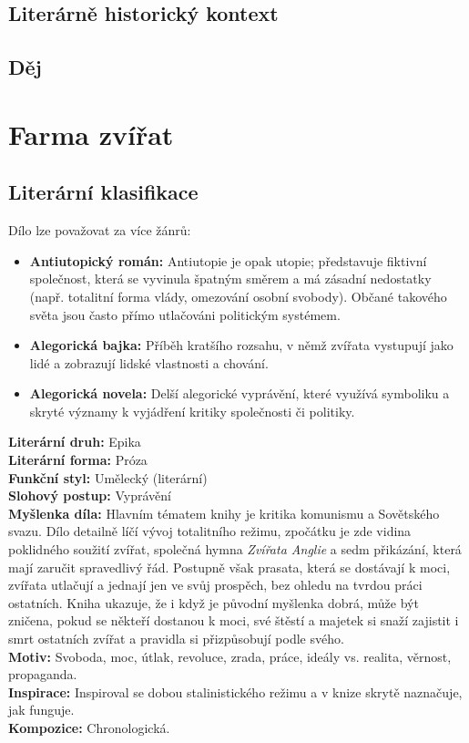 \documentclass[12pt, a4paper]{article}
\newcommand{\mybf}[1]{\textcolor[RGB]{0, 179, 219}{\textbf{#1}}}
\begin{document}
\subsection*{Literárně historický kontext}

{\color{subsectioncolor}\hrulefill}
\subsection*{\color{subsectioncolor}Děj}

\newpage
\section{Farma zvířat}

\subsection*{Literární klasifikace}
Dílo lze považovat za více žánrů:
\begin{itemize}[itemsep=0.3em]
	\item \textbf{Antiutopický román:} Antiutopie je opak utopie; představuje fiktivní společnost, která se vyvinula špatným směrem a má zásadní nedostatky (např. totalitní forma vlády, omezování osobní svobody). Občané takového světa jsou často přímo utlačováni politickým systémem.
	\item \textbf{Alegorická bajka:} Příběh kratšího rozsahu, v němž zvířata vystupují jako lidé a zobrazují lidské vlastnosti a chování.
	\item \textbf{Alegorická novela:} Delší alegorické vyprávění, které využívá symboliku a skryté významy k vyjádření kritiky společnosti či politiky.
\end{itemize}
\mybf{Literární druh:} Epika\\[3pt]
\mybf{Literární forma:} Próza\\[3pt]
\mybf{Funkční styl:} Umělecký (literární)\\[3pt]
\mybf{Slohový postup:} Vyprávění\\[10pt]
\mybf{Myšlenka díla:} Hlavním tématem knihy je kritika komunismu a Sovětského svazu. Dílo detailně líčí vývoj totalitního režimu, zpočátku je zde vidina poklidného soužití zvířat, společná hymna \textit{Zvířata Anglie} a sedm přikázání, která mají zaručit spravedlivý řád. Postupně však prasata, která se dostávají k moci, zvířata utlačují a jednají jen ve svůj prospěch, bez ohledu na tvrdou práci ostatních. Kniha ukazuje, že i když je původní myšlenka dobrá, může být zničena, pokud se někteří dostanou k moci, své štěstí a majetek si snaží zajistit i smrt ostatních zvířat a pravidla si přizpůsobují podle svého.\\[10pt]
\mybf{Motiv:} Svoboda, moc, útlak, revoluce, zrada, práce, ideály vs. realita, věrnost, propaganda.\\[10pt]
\mybf{Inspirace:} Inspiroval se dobou stalinistického režimu a v knize skrytě naznačuje, jak funguje.\\[10pt]
\mybf{Kompozice:} Chronologická.
\end{document}

